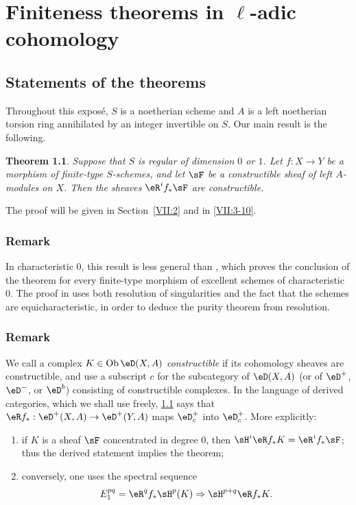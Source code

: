 \documentclass[12pt,oneside,english]{smfbook}
\DeclareMathOperator{\ob}{Ob}
\newcounter{char}
\newtheorem{theorem_}[subsection]{Theorem}
\begin{document}
\chapter{Finiteness theorems in \texorpdfstring{$\ell$}{l}-adic cohomology}\label{VII}

\section{Statements of the theorems}\label{VII:1}

Throughout this exposé, $S$ is a noetherian scheme and $A$ is a left noetherian torsion ring annihilated by an integer invertible on $S$. Our main result is the following.

\begin{theorem_}\label{VII:1-1}
Suppose that $S$ is regular of dimension $0$ or $1$. Let $f:X\to Y$ be a morphism of finite-type $S$-schemes, and let $\sF$ be a constructible sheaf of left $A$-modules on $X$. Then the sheaves $\eR^if_\ast\sF$ are constructible.
\end{theorem_}

The proof will be given in Section~\ref{VII:2} and in \ref{VII:3-10}.

\subsection{Remark}\label{VII:1-2}

In characteristic $0$, this result is less general than \cite[XIX, \S5]{sga4}, which proves the conclusion of the theorem for every finite-type morphism of excellent schemes of characteristic $0$. The proof in \cite[XIX]{sga4} uses both resolution of singularities and the fact that the schemes are equicharacteristic, in order to deduce the purity theorem from resolution.

\subsection{Remark}\label{VII:1-3}

We call a complex $K\in\ob\eD(X,A)$ \emph{constructible} if its cohomology sheaves are constructible, and use a subscript $c$ for the subcategory of $\eD(X,A)$ (or of $\eD^+$, $\eD^-$, or $\eD^b$) consisting of constructible complexes. In the language of derived categories, which we shall use freely, \ref{VII:1-1} says that $\eR f_\ast:\eD^+(X,A)\to\eD^+(Y,A)$ maps $\eD_c^+$ into $\eD_c^+$. More explicitly:
\begin{enumerate}[\indent a)]
  \item if $K$ is a sheaf $\sF$ concentrated in degree $0$, then $\sH^i\eR f_\ast K=\eR^if_\ast\sF$; thus the derived statement implies the theorem;
  \item conversely, one uses the spectral sequence
    \[
      E_1^{p q} = \eR^q f_\ast \sH^p(K) \Rightarrow \sH^{p+q} \eR f_\ast K \text{.}
    \]
\end{enumerate}
\end{document}
